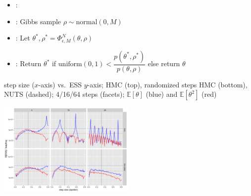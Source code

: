 \documentclass[10pt]{report}
\begin{document}
\begin{itemize}
\item {}:
\item {}: Gibbs sample $\rho \sim \textrm{normal}(0, M)$
\item {}:  Let $\theta^*, \rho^* = \Phi_{\epsilon,M}^N(\theta, \rho)$
\item {}: Return $\theta^*$ if $\textrm{uniform}(0, 1) <
  \dfrac{p(\theta^*, \rho^*)}
       {p(\theta, \rho)}$ else return $\theta$
\end{itemize}

\begin{subitemize}
\item step size ($x$-axis) vs.\ ESS $y$-axis; HMC (top), randomized
  steps HMC (bottom), NUTS (dashed); 
  4/16/64 steps (facets); $\mathbb{E}[\theta]$ (blue) and
  $\mathbb{E}[\theta^2]$ (red)
\end{subitemize}
\vspace*{-3pt}
\begin{center}
  \includegraphics[width=2.6in]{img/hmc-harmonics.png}
\end{center}
\end{document}
